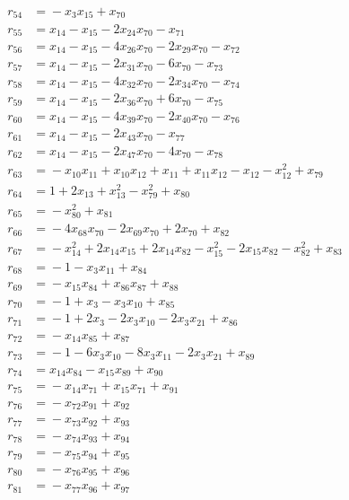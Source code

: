 \begin{align*}
r_{54} &={}-x_{3}x_{15} +x_{70} \\
r_{55} &={}x_{14} -x_{15} -2x_{24}x_{70} -x_{71} \\
r_{56} &={}x_{14} -x_{15} -4x_{26}x_{70} -2x_{29}x_{70} -x_{72} \\
r_{57} &={}x_{14} -x_{15} -2x_{31}x_{70} -6x_{70} -x_{73} \\
r_{58} &={}x_{14} -x_{15} -4x_{32}x_{70} -2x_{34}x_{70} -x_{74} \\
r_{59} &={}x_{14} -x_{15} -2x_{36}x_{70} +6x_{70} -x_{75} \\
r_{60} &={}x_{14} -x_{15} -4x_{39}x_{70} -2x_{40}x_{70} -x_{76} \\
r_{61} &={}x_{14} -x_{15} -2x_{43}x_{70} -x_{77} \\
r_{62} &={}x_{14} -x_{15} -2x_{47}x_{70} -4x_{70} -x_{78} \\
r_{63} &={}-x_{10}x_{11} +x_{10}x_{12} +x_{11} +x_{11}x_{12} -x_{12} -x_{12}^{2} +x_{79} \\
r_{64} &={}1 +2x_{13} +x_{13}^{2} -x_{79}^{2} +x_{80} \\
r_{65} &={}-x_{80}^{2} +x_{81} \\
r_{66} &={}-4x_{68}x_{70} -2x_{69}x_{70} +2x_{70} +x_{82} \\
r_{67} &={}-x_{14}^{2} +2x_{14}x_{15} +2x_{14}x_{82} -x_{15}^{2} -2x_{15}x_{82} -x_{82}^{2} +x_{83} \\
r_{68} &={}-1 -x_{3}x_{11} +x_{84} \\
r_{69} &={}-x_{15}x_{84} +x_{86}x_{87} +x_{88} \\
r_{70} &={}-1 +x_{3} -x_{3}x_{10} +x_{85} \\
r_{71} &={}-1 +2x_{3} -2x_{3}x_{10} -2x_{3}x_{21} +x_{86} \\
r_{72} &={}-x_{14}x_{85} +x_{87} \\
r_{73} &={}-1 -6x_{3}x_{10} -8x_{3}x_{11} -2x_{3}x_{21} +x_{89} \\
r_{74} &={}x_{14}x_{84} -x_{15}x_{89} +x_{90} \\
r_{75} &={}-x_{14}x_{71} +x_{15}x_{71} +x_{91} \\
r_{76} &={}-x_{72}x_{91} +x_{92} \\
r_{77} &={}-x_{73}x_{92} +x_{93} \\
r_{78} &={}-x_{74}x_{93} +x_{94} \\
r_{79} &={}-x_{75}x_{94} +x_{95} \\
r_{80} &={}-x_{76}x_{95} +x_{96} \\
r_{81} &={}-x_{77}x_{96} +x_{97} \\

\end{align*}

